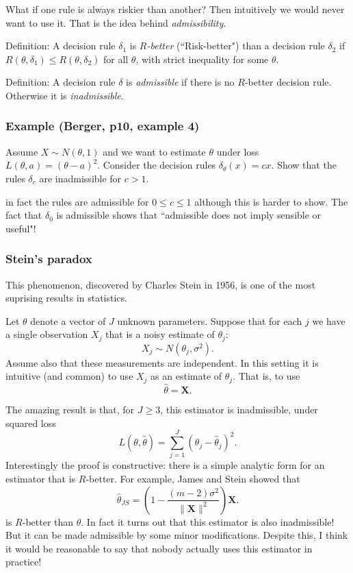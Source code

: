 \documentclass[12pt]{article}
\begin{document}
What if one rule is always riskier than another? Then intuitively we would
never want to use it. That is the idea behind {\it admissibility}.

\medskip
Definition:  A decision rule $\delta_1$ is {\it $R$-better} (``Risk-better") than
a decision rule $\delta_2$ if $R(\theta,\delta_1) \leq R(\theta,\delta_2)$ for all $\theta$, with strict inequality for some $\theta$.

\medskip
Definition: A decision rule $\delta$ is {\it admissible} if there is no $R$-better decision rule. Otherwise it is {\it inadmissible}.

\subsubsection{Example (Berger, p10, example 4)}

Assume $X \sim N(\theta,1)$ and we want to estimate $\theta$ under loss $L(\theta,a) = (\theta-a)^2$. Consider the decision rules $\delta_\theta(x) =cx$.
Show that the rules $\delta_c$ are inadmissible for $c>1$.

in fact the rules are admissible for $0 \leq c \leq 1$ although this is harder to show. The fact that $\delta_0$ is admissible shows that ``admissible does not imply sensible or useful"!

\subsubsection*{Stein's paradox}

This phenomenon, discovered by Charles Stein in 1956, is one of the most suprising results in statistics.

Let $\theta$ denote a vector of $J$ unknown parameters. Suppose that for each $j$ we have a single observation $X_j$ that is a noisy estimate of $\theta_j$:
\begin{equation}
X_j \sim N(\theta_j, \sigma^2).
\end{equation}
Assume also that these measurements are independent. In this setting it is intuitive (and common) to use $X_j$ as an estimate of $\theta_j$.
That is, to use
\begin{equation}
\hat{\theta} = \mathbf X.
\end{equation}

The amazing result is that, for $J \geq 3$, this estimator is inadmissible, under squared loss
\begin{equation}
L(\theta,\hat{\theta})  = \sum_{j=1}^J (\theta_j - \hat{\theta}_j)^2.
\end{equation}
Interestingly the proof is constructive: there is a simple analytic form for an estimator that is $R$-better.
For example, James and Stein showed that
\begin{equation} \label{eqn:js}
\hat{\theta}_{JS} =  \left( 1 - \frac{(m-2) \sigma^2}{\|{\mathbf X}\|^2} \right) \mathbf X.
\end{equation}
is $R$-better than $\hat{\theta}$. In fact it turns out that this estimator is also inadmissible!
But it can be made admissible by some minor modifications.
Despite this, I think it would be reasonable to say that nobody actually uses this estimator in practice!
\end{document}
